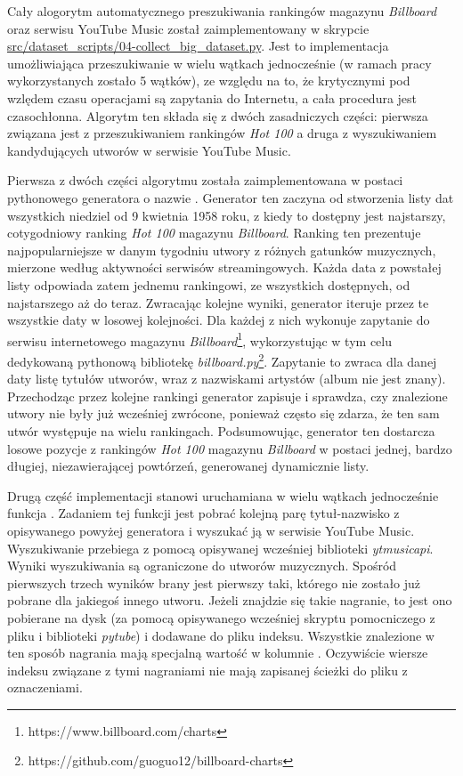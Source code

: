 Cały alogorytm automatycznego preszukiwania rankingów magazynu \emph{Billboard} oraz serwisu YouTube
Music został zaimplementowany w skrypcie \url{src/dataset\_scripts/04-collect\_big\_dataset.py}. Jest
to implementacja umożliwiająca przeszukiwanie w wielu wątkach jednocześnie (w ramach pracy
wykorzystanych zostało 5 wątków), ze względu na to, że krytycznymi pod wzlędem czasu operacjami są
zapytania do Internetu, a cała procedura jest czasochłonna. Algorytm ten składa się z dwóch
zasadniczych części: pierwsza związana jest z przeszukiwaniem rankingów \emph{Hot 100} a druga z
wyszukiwaniem kandydujących utworów w serwisie YouTube Music.

Pierwsza z dwóch części algorytmu została zaimplementowana w postaci pythonowego generatora o nazwie
. Generator ten zaczyna od stworzenia listy dat wszystkich
niedziel od 9 kwietnia 1958 roku, z kiedy to dostępny jest najstarszy, cotygodniowy ranking
\emph{Hot 100} magazynu \emph{Billboard}. Ranking ten prezentuje najpopularniejsze w danym tygodniu
utwory z różnych gatunków muzycznych, mierzone według aktywności serwisów streamingowych. Każda data
z powstałej listy odpowiada zatem jednemu rankingowi, ze wszystkich dostępnych, od najstarszego aż
do teraz. Zwracając kolejne wyniki, generator iteruje przez te wszystkie daty w losowej kolejności.
Dla każdej z nich wykonuje zapytanie do serwisu internetowego magazynu
\emph{Billboard}\footnote{https://www.billboard.com/charts}, wykorzystując w tym celu dedykowaną
pythonową bibliotekę \emph{billboard.py}\footnote{https://github.com/guoguo12/billboard-charts}.
Zapytanie to zwraca dla danej daty listę tytułów utworów, wraz z nazwiskami artystów (album nie jest
znany). Przechodząc przez kolejne rankingi generator zapisuje i sprawdza, czy znalezione utwory nie
były już wcześniej zwrócone, ponieważ często się zdarza, że ten sam utwór występuje na wielu
rankingach. Podsumowując, generator ten dostarcza losowe pozycje z rankingów \emph{Hot 100} magazynu
\emph{Billboard} w postaci jednej, bardzo długiej, niezawierającej powtórzeń, generowanej
dynamicznie listy.

Drugą część implementacji stanowi uruchamiana w wielu wątkach jednocześnie funkcja
. Zadaniem tej funkcji jest pobrać kolejną parę tytuł-nazwisko z
opisywanego powyżej generatora i wyszukać ją w serwisie YouTube Music. Wyszukiwanie przebiega z
pomocą opisywanej wcześniej biblioteki \emph{ytmusicapi}. Wyniki wyszukiwania są ograniczone do
utworów muzycznych. Spośród pierwszych trzech wyników brany jest pierwszy taki, którego
 nie zostało już pobrane dla jakiegoś innego utworu. Jeżeli znajdzie się takie
nagranie, to jest ono pobierane na dysk (za pomocą opisywanego wcześniej skryptu pomocniczego z
pliku i biblioteki \emph{pytube}) i dodawane do pliku indeksu. Wszystkie znalezione w ten sposób
nagrania mają specjalną wartość  w kolumnie . Oczywiście wiersze
indeksu związane z tymi nagraniami nie mają zapisanej ścieżki do pliku z oznaczeniami.

